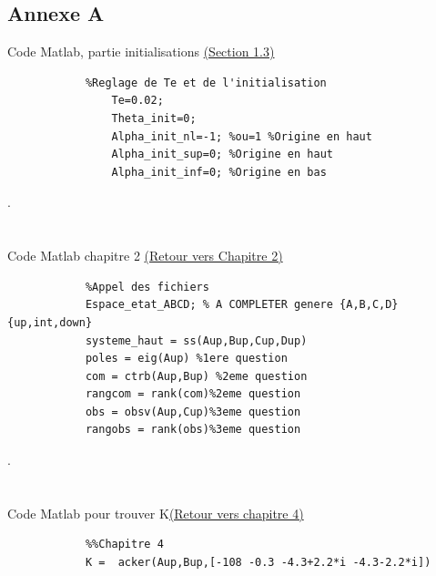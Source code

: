 \documentclass[12pt, a4paper, openany]{report}
\begin{document}
\begin{appendices}
\chapter*{Annexe A}
		Code Matlab, partie initialisations \hyperref[annexe1]{(Section 1.3)}\label{section1.3}
		\begin{lstlisting}
			%Reglage de Te et de l'initialisation
    			Te=0.02;
    			Theta_init=0;
    			Alpha_init_nl=-1; %ou=1 %Origine en haut
    			Alpha_init_sup=0; %Origine en haut
    			Alpha_init_inf=0; %Origine en bas    			
		\end{lstlisting}
		.\\\\\\
		Code Matlab chapitre 2 \hyperref[annexe11]{(Retour vers Chapitre 2)}\label{section1.11}
		\begin{lstlisting}
			%Appel des fichiers
			Espace_etat_ABCD; % A COMPLETER genere {A,B,C,D}{up,int,down}
			systeme_haut = ss(Aup,Bup,Cup,Dup)
			poles = eig(Aup) %1ere question
			com = ctrb(Aup,Bup) %2eme question
			rangcom = rank(com)%2eme question
			obs = obsv(Aup,Cup)%3eme question
			rangobs = rank(obs)%3eme question		    			
		\end{lstlisting}
		.\\\\\\
		Code Matlab pour trouver K\hyperref[annexe111]{(Retour vers chapitre 4)}\label{section1.111}
		\begin{lstlisting}
			%%Chapitre 4
			K =  acker(Aup,Bup,[-108 -0.3 -4.3+2.2*i -4.3-2.2*i])  			
		\end{lstlisting}
				
\end{appendices}





%
%
\end{document}
